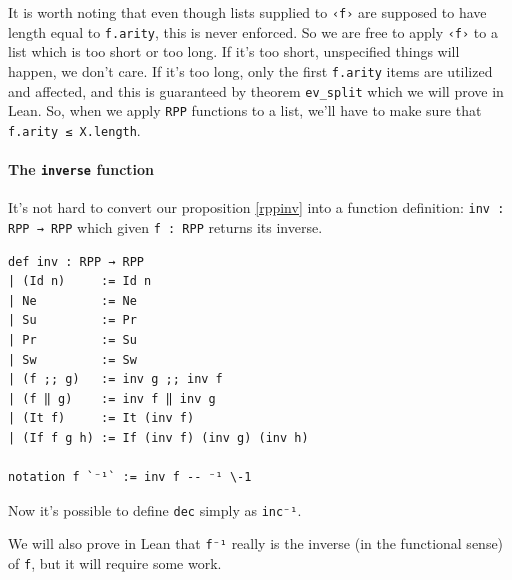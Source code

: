 \documentclass{book}
\theoremstyle{definition}
\theoremstyle{remark}
\theoremstyle{plain}
\begin{document}
It is worth noting that even though lists supplied to \lstinline{‹f›} are supposed to have length equal to \lstinline{f.arity},
this is never enforced.
So we are free to apply \lstinline{‹f›} to a list which is too short or too long.
If it's too short, unspecified things will happen, we don't care.
If it's too long, only the first \lstinline{f.arity} items are utilized and affected,
and this is guaranteed by theorem \lstinline{ev_split} which we will prove in Lean.
So, when we apply \lstinline{RPP} functions to a list, we'll have to make sure that
\lstinline{f.arity ≤ X.length}.

\paragraph{The \lstinline{inverse} function}
It's not hard to convert our proposition \ref{rppinv} into a function definition:
\lstinline{inv : RPP → RPP} which given \lstinline{f : RPP} returns its inverse.
\begin{lstlisting}
def inv : RPP → RPP
| (Id n)     := Id n
| Ne         := Ne
| Su         := Pr
| Pr         := Su
| Sw         := Sw
| (f ;; g)   := inv g ;; inv f
| (f ‖ g)    := inv f ‖ inv g
| (It f)     := It (inv f)
| (If f g h) := If (inv f) (inv g) (inv h)

notation f `⁻¹` := inv f -- ⁻¹ \-1
\end{lstlisting}
Now it's possible to define \lstinline{dec} simply as \lstinline{inc⁻¹}.

We will also prove in Lean that \lstinline{f⁻¹} really is the inverse (in the functional sense) of \lstinline{f},
but it will require some work.
\end{document}
